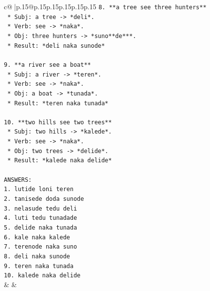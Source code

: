 \documentclass{article}
\begin{document}
{\begin{supertabular}{c@{$\;$}|p{.15\linewidth}@{}p{.15\linewidth}p{.15\linewidth}p{.15\linewidth}p{.15\linewidth}p{.15\linewidth}}
{{{\texttt{8.  **a tree see three hunters**} \\
\texttt{    *   Subj: a tree {-}> *deli*.} \\
\texttt{    *   Verb: see {-}> *naka*.} \\
\texttt{    *   Obj: three hunters {-}> *suno**de***.} \\
\texttt{    *   Result: *deli naka sunode*} \\
\\ 
\texttt{9.  **a river see a boat**} \\
\texttt{    *   Subj: a river {-}> *teren*.} \\
\texttt{    *   Verb: see {-}> *naka*.} \\
\texttt{    *   Obj: a boat {-}> *tunada*.} \\
\texttt{    *   Result: *teren naka tunada*} \\
\\ 
\texttt{10. **two hills see two trees**} \\
\texttt{    *   Subj: two hills {-}> *kalede*.} \\
\texttt{    *   Verb: see {-}> *naka*.} \\
\texttt{    *   Obj: two trees {-}> *delide*.} \\
\texttt{    *   Result: *kalede naka delide*} \\
\\ 
\texttt{ANSWERS:} \\
\texttt{1. lutide loni teren} \\
\texttt{2. tanisede doda sunode} \\
\texttt{3. nelasude tedu deli} \\
\texttt{4. luti tedu tunadade} \\
\texttt{5. delide naka tunada} \\
\texttt{6. kale naka kalede} \\
\texttt{7. terenode naka suno} \\
\texttt{8. deli naka sunode} \\
\texttt{9. teren naka tunada} \\
\texttt{10. kalede naka delide} \\
            }
        }
    }
    & & \\ \\


\end{supertabular}}
\end{document}
